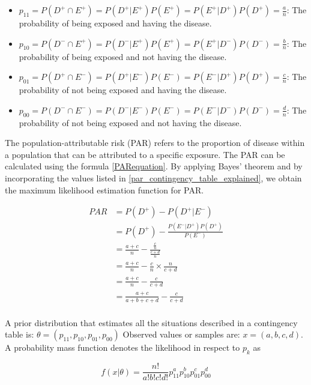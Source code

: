 \begin{itemize}
    \item $p_{11} = P(D^+ \cap E^+) = P(D^+ | E^+)P(E^+) = P(E^+ | D^+)P(D^+) = \frac{a}{n}$: The probability of being exposed and having the disease.
    \item $p_{10} = P(D^- \cap E^+) = P(D^- | E^+)P(E^+) = P(E^+ | D^-)P(D^-) = \frac{b}{n}$: The probability of being exposed and not having the disease.
    \item $p_{01} = P(D^+ \cap E^-) = P(D^+ | E^-)P(E^-) = P(E^- | D^+)P(D^+) = \frac{c}{n}$: The probability of not being exposed and having the disease.
    \item $p_{00} = P(D^- \cap E^-) = P(D^- | E^-)P(E^-) = P(E^- | D^-)P(D^-) = \frac{d}{n}$: The probability of not being exposed and not having the disease.
\end{itemize}\label{par_contingency_table_explained}

The population-attributable risk (PAR) refers to the proportion of disease within a population that can be attributed to a specific exposure. The PAR can be calculated using the formula \ref{PARequation}. By applying Bayes' theorem and by incorporating the values listed in \ref{par_contingency_table_explained}, we obtain the maximum likelihood estimation function for PAR.

\begin{equation}\label{PARequationProof}
\begin{aligned}
PAR &= P(D^+) - P(D^+| E^-) \\
    &= P(D^+) - \frac{P(E^-|D^+)P(D^+)}{P(E^-)} \\
    &= \frac{a + c}{n} - \frac{\frac{c}{n}}{\frac{c + d}{n}} \\
    &= \frac{a + c}{n} - \frac{c}{n} \times  \frac{n}{c + d} \\
    &= \frac{a + c}{n} - \frac{c}{c + d} \\
    &= \frac{a + c}{a + b + c + d} - \frac{c}{c + d} \\
\end{aligned}
\end{equation}

A prior distribution that estimates all the situations described in a contingency table is: $\theta = (p_{11}, p_{10}, p_{01}, p_{00})$
Observed values or samples are: $x = (a, b, c, d)$. A probability mass function denotes the likelihood in respect to $p_k$ as

\begin{equation}
    f(x|\theta) = \frac{n!}{a!b!c!d!}p_{11}^ap_{10}^bp_{01}^cp_{00}^d
\end{equation}

